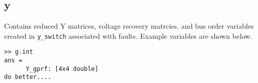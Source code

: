 \subsection{y}  
Contains reduced Y matrices, voltage recovery matrcies, and bus order variables created in \verb|y_switch| associated with faults.
Example variables are shown below.
\begin{verbatim}
>> g.int
ans = 
      Y_gprf: [4x4 double]
do better....
\end{verbatim}

\begin{comment}

template for subparagraphs

\subsection{xxx} %
\begin{verbatim}

\end{verbatim}

\end{comment}